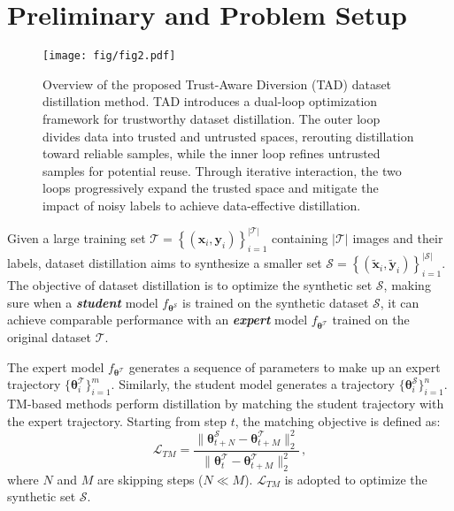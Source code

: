 \section{Preliminary and Problem Setup}
\label{sec_3-1}

\begin{figure*}[ht]
    \centering
    \texttt{[image: fig/fig2.pdf]}
    \vspace{-1em}
    \caption{
    Overview of the proposed Trust-Aware Diversion (TAD) dataset distillation method. 
    TAD introduces a dual-loop optimization framework for trustworthy dataset distillation. 
    The outer loop divides data into trusted and untrusted spaces, rerouting distillation toward reliable samples, while the inner loop refines untrusted samples for potential reuse. 
    Through iterative interaction, the two loops progressively expand the trusted space and mitigate the impact of noisy labels to achieve data-effective distillation.
    }
    \vspace{-1em}
    \label{fig3}
\end{figure*}


Given a large training set $\mathcal{T}=\left\{\left(\bm{x}_{i}, \bm{y}_{i}\right)\right\}_{i=1}^{|\mathcal{T}|}$ containing $|\mathcal{T}|$ images and their labels, dataset distillation aims to synthesize a smaller set $\mathcal{S}=\left\{\left(\bm{\widetilde x}_{i}, \bm{\widetilde y}_{i}\right)\right\}_{i=1}^{|\mathcal{S}|}$. 
The objective of dataset distillation is to optimize the synthetic set $\mathcal{S}$, making sure when a \emph{\textbf{student}} model $f_{\boldsymbol{\theta}^\mathcal{S}}$ is trained on the synthetic dataset $\mathcal{S}$, it can achieve comparable performance 
with an \emph{\textbf{expert}} model $f_{\boldsymbol{\theta}^\mathcal{T}}$ trained on the original dataset $\mathcal{T}$. 


The expert model $f_{\boldsymbol{\theta}^\mathcal{T}}$ generates a sequence of parameters to make up an expert trajectory $\{\boldsymbol{\theta}^\mathcal{T}_i\}_{i=1}^{m}$. 
Similarly, the student model generates a trajectory $\{\boldsymbol{\theta}^\mathcal{S}_i\}_{i=1}^{n}$. 
TM-based methods perform distillation by matching the student trajectory with the expert trajectory. 
Starting from step $t$, the matching objective is defined as: 
\begin{equation}
    \label{eq1}
    \mathcal{L}_{TM} = \frac{\|\boldsymbol{\theta}^\mathcal{S}_{t+N} - \boldsymbol{\theta}^\mathcal{T}_{t+M}\|_2^2}
    {\|\boldsymbol{\theta}^\mathcal{T}_{t} - \boldsymbol{\theta}^\mathcal{T}_{t+M}\|_2^2}\,,
\end{equation}
where $N$ and $M$ are skipping steps ($N\ll M$). $\mathcal{L}_{TM}$ is adopted to optimize the synthetic set $\mathcal{S}$. 


